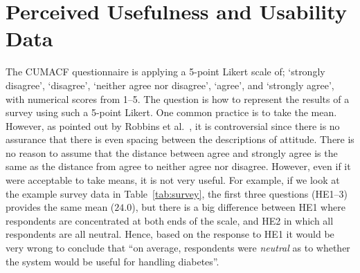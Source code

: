 \section{Perceived Usefulness and Usability Data}

The \ac{CUMACF} questionnaire is applying a 5-point Likert scale of; `strongly disagree', `disagree', `neither agree nor disagree', `agree', and `strongly agree', with numerical scores from 1--5.
%
The question is how to represent the results of a survey using such a 5-point Likert. 
%
One common practice is to take the mean. However, as pointed out by Robbins et al.~\cite{robbins2011plotting}, it is controversial since there is no assurance that there is even spacing between the descriptions of attitude. There is no reason to assume that the distance between agree and strongly agree is the same as the distance from agree to neither agree nor disagree. However, even if it were acceptable to take means, it is not very useful. 
%
For example, if we look at the example survey data in Table~\ref{tab:survey}, the first three questions (HE1--3) provides the same mean ($24.0$), but there is a big difference between HE1 where respondents are concentrated at both ends of the scale, and HE2 in which all respondents are all neutral. Hence, based on the response to HE1 it would be very wrong to conclude that ``on average, respondents were \textit{neutral} as to whether the system would be useful for handling diabetes''.


